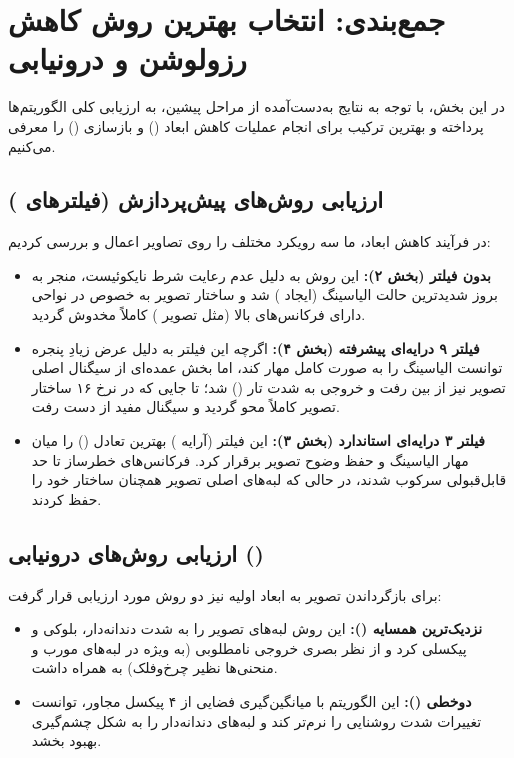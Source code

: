 \section{جمع‌بندی: انتخاب بهترین روش کاهش رزولوشن و درونیابی}

در این بخش، با توجه به نتایج به‌دست‌آمده از مراحل پیشین، به ارزیابی کلی الگوریتم‌ها پرداخته و بهترین ترکیب برای انجام عملیات کاهش ابعاد () و بازسازی () را معرفی می‌کنیم.

\subsection*{ارزیابی روش‌های پیش‌پردازش (فیلترهای )}
در فرآیند کاهش ابعاد، ما سه رویکرد مختلف را روی تصاویر اعمال و بررسی کردیم:
\begin{itemize}
    \item \textbf{بدون فیلتر (بخش ۲):} این روش به دلیل عدم رعایت شرط نایکوئیست، منجر به بروز شدیدترین حالت الیاسینگ (ایجاد ) شد و ساختار تصویر به خصوص در نواحی دارای فرکانس‌های بالا (مثل تصویر ) کاملاً مخدوش گردید.
    \item \textbf{فیلتر ۹ درایه‌ای پیشرفته (بخش ۴):} اگرچه این فیلتر به دلیل عرض زیادِ پنجره توانست الیاسینگ را به صورت کامل مهار کند، اما بخش عمده‌ای از سیگنال اصلی تصویر نیز از بین رفت و خروجی به شدت تار () شد؛ تا جایی که در نرخ ۱۶ ساختار تصویر کاملاً محو گردید و سیگنال مفید از دست رفت.
    \item \textbf{فیلتر ۳ درایه‌ای استاندارد (بخش ۳):} این فیلتر (آرایه \lr{[0.25, 0.5, 0.25]}) بهترین تعادل () را میان مهار الیاسینگ و حفظ وضوح تصویر برقرار کرد. فرکانس‌های خطرساز تا حد قابل‌قبولی سرکوب شدند، در حالی که لبه‌های اصلی تصویر همچنان ساختار خود را حفظ کردند.
\end{itemize}

\subsection*{ارزیابی روش‌های درونیابی ()}
برای بازگرداندن تصویر به ابعاد اولیه نیز دو روش مورد ارزیابی قرار گرفت:
\begin{itemize}
    \item \textbf{نزدیک‌ترین همسایه ():} این روش لبه‌های تصویر را به شدت دندانه‌دار، بلوکی و پیکسلی کرد و از نظر بصری خروجی نامطلوبی (به ویژه در لبه‌های مورب و منحنی‌ها نظیر چرخ‌وفلک) به همراه داشت.
    \item \textbf{دوخطی ():} این الگوریتم با میانگین‌گیری فضایی از ۴ پیکسل مجاور، توانست تغییرات شدت روشنایی را نرم‌تر کند و لبه‌های دندانه‌دار را به شکل چشم‌گیری بهبود بخشد.
\end{itemize}

